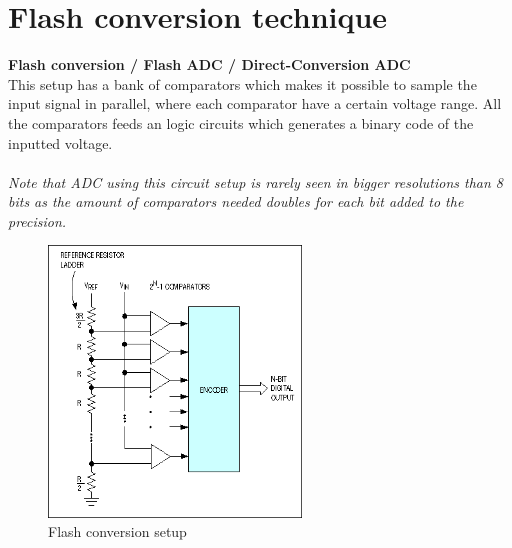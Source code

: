\section{Flash conversion technique}
\textbf{Flash conversion / Flash ADC / Direct-Conversion ADC}\\
This setup has a bank of comparators which makes it possible to sample the input signal in parallel, where each comparator have a certain voltage range.
All the comparators feeds an logic circuits which generates a binary code of the inputted voltage.\\
\\ \textit{Note that ADC using this circuit setup is rarely seen in bigger resolutions than 8 bits as the amount of comparators needed doubles for each bit added to the precision.}
\begin{figure}[h!]		%
	\begin{centering}
 		\includegraphics[width=0.6\textwidth]{images/flash_conv.png}
		\caption{Flash conversion setup}
	\end{centering}
\end{figure}
\newpage
